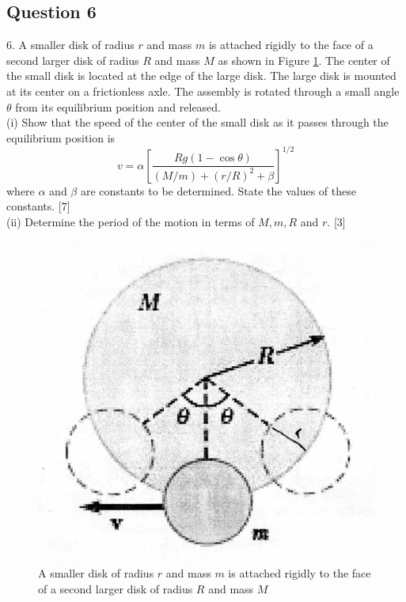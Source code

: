 \documentclass{article}
\begin{document}
\subsection{Question 6}
6. A smaller disk of radius $r$ and mass $m$ is attached rigidly to the face of a second larger disk of radius $R$ and mass $M$ as shown in Figure \ref{2010q6}. The center of the small disk is located at the edge of the large disk. The large disk is mounted at its center on a frictionless axle. The assembly is rotated through a small angle $\theta$ from its equilibrium position and released. \\
(i) Show that the speed of the center of the small disk as it passes through the equilibrium position is
$$
v=\alpha\left[\frac{R g(1-\cos \theta)}{(M / m)+(r / R)^{2}+\beta}\right]^{1 / 2}
$$
where $\alpha$ and $\beta$ are constants to be determined. State the values of these constants. [7]\\
(ii) Determine the period of the motion in terms of $M, m, R$ and $r$. [3]
\begin{figure}
	\centering
	\includegraphics[width=0.5\linewidth]{spho_book_TYS_images/2010q6.png}
	\caption{A smaller disk of radius $r$ and mass $m$ is attached rigidly to the face of a second larger disk of radius $R$ and mass $M$}\label{2010q6}
\end{figure}
\end{document}
